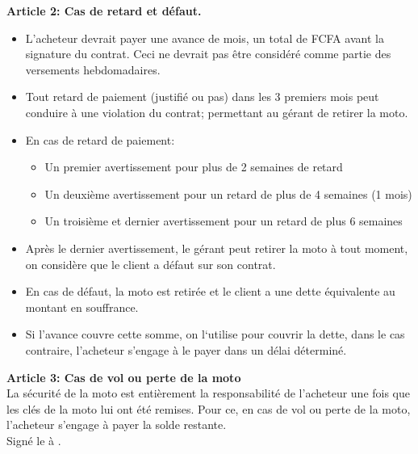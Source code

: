 \documentclass[12pt]{article}
\begin{document}
\textbf{Article 2: Cas de retard et défaut.} 
\begin{itemize}
	\item[A.]L’acheteur devrait payer une avance de \underline{\hspace{2cm}} mois, un total de \underline{\hspace{5cm}} FCFA avant la signature du contrat. Ceci ne devrait pas être considéré comme partie des versements hebdomadaires.
	\item[B.]Tout retard de paiement (justifié ou pas) dans les 3 premiers mois peut conduire à une violation du contrat; permettant au gérant de retirer la moto. 
	\item[C.]En cas de retard de paiement: 
		\begin{itemize}
			\item[a.]Un premier avertissement pour plus de 2 semaines de retard 
			\item[b.]Un deuxième avertissement pour un retard de plus de 4 semaines (1 mois) 
			\item[c.]Un troisième et dernier avertissement pour un retard de plus 6 semaines 
		\end{itemize}
	\item[D.] Après le dernier avertissement, le gérant peut retirer la moto à tout moment, on considère que le client a défaut sur son contrat. 
	\item[E.]En cas de défaut, la moto est retirée et le client a une dette équivalente au montant en souffrance.
	\item[F.]Si l’avance couvre cette somme, on l‘utilise pour couvrir la dette, dans le cas contraire, l’acheteur s'engage à le payer dans un délai déterminé.
\end{itemize}


\textbf{Article 3: Cas de vol ou perte de la moto} \\
La sécurité de la moto est entièrement la responsabilité de l’acheteur une fois que les clés de la moto lui ont été remises. Pour ce, en cas de vol ou perte de la moto, l’acheteur s'engage à payer la solde restante.\\
Signé le \underline{\hspace{5cm}} à \underline{\hspace{5cm}}. \\
\end{document}
